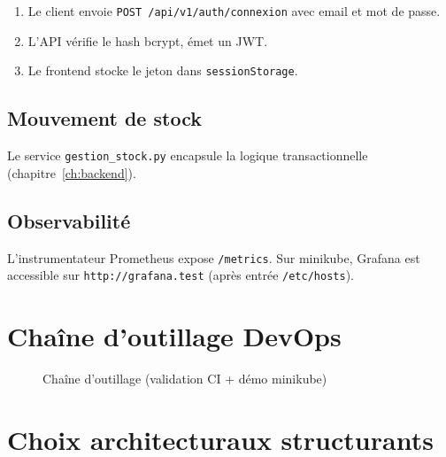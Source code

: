 \begin{enumerate}
  \item Le client envoie \texttt{POST /api/v1/auth/connexion} avec email et mot de passe.
  \item L'API vérifie le hash bcrypt, émet un JWT.
  \item Le frontend stocke le jeton dans \texttt{sessionStorage}.
\end{enumerate}

\subsection{Mouvement de stock}

Le service \texttt{gestion\_stock.py} encapsule la logique transactionnelle (chapitre~\ref{ch:backend}).

\subsection{Observabilité}

L'instrumentateur Prometheus expose \texttt{/metrics}. Sur minikube, Grafana est accessible sur \texttt{http://grafana.test} (après entrée \texttt{/etc/hosts}).

\section{Chaîne d'outillage DevOps}

\begin{figure}[htbp]
  \centering
  \caption{Chaîne d'outillage (validation CI + démo minikube)}
  \label{fig:devops-chain}
\end{figure}

\section{Choix architecturaux structurants}

